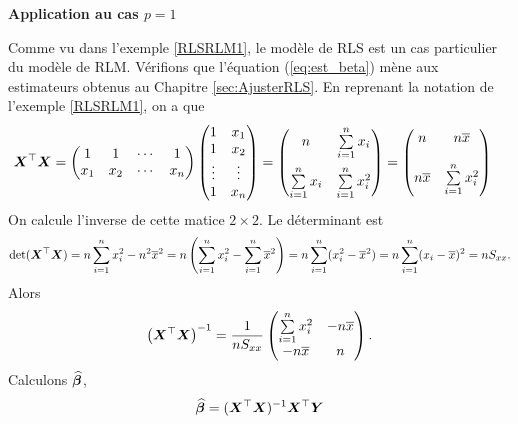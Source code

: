 \begin{exemple}
    {\bf Application au cas $p=1$}

    Comme vu dans l'exemple \ref{RLSRLM1}, le modèle de RLS est un cas particulier du modèle de RLM. Vérifions que l'équation (\ref{eq:est_beta}) mène aux estimateurs obtenus au Chapitre \ref{sec:AjusterRLS}.
    En reprenant la notation de l'exemple \ref{RLSRLM1}, on a que 
    \begin{align*}
        \bm{X}^\top \bm{X}
        &=
        \begin{pmatrix}
        1 & 1 & \cdots & 1   \\
        x_1 & x_{2} & \cdots & x_n  
    \end{pmatrix}
        \begin{pmatrix}
        1 & x_{1}   \\
        1 & x_{2}  \\
        \vdots & \vdots \\
        1 & x_{n}  
    \end{pmatrix}
    = \begin{pmatrix}
        n & \sum\limits_{i=1}^n x_i  \\[4mm]
        \sum\limits_{i=1}^n x_i  & \sum\limits_{i=1}^n x_i^2
    \end{pmatrix}
    = 
    \begin{pmatrix}
        n & n \overline{x} \\[4mm]
         n \overline{x}   & \sum\limits_{i=1}^n x_i^2
    \end{pmatrix}
    \end{align*}
   On calcule l'inverse de cette matice $2\times 2$. Le déterminant est 
   $$	\mathrm{det}(\bm{X}^\top\bm{X}) = n \sum_{i=1}^n x_i^2 - n^2\overline{x}^2
	= n \left(\sum_{i=1}^n x_i^2 - \sum_{i=1}^n \overline{x}^2\right)
	= n \sum_{i=1}^n  (x_i^2 - \overline{x}^2)
	= n \sum_{i=1}^n  (x_i - \overline{x})^2
	= n S_{xx}. $$
    Alors
    \begin{align*}
        \left(\bm{X}^\top \bm{X}\right) ^{-1}
        =  \frac{1}{nS_{xx}} \begin{pmatrix}
            \sum\limits_{i=1}^n x_i^2 & -n\overline{x}\\
            -n\overline{x} & n 
        \end{pmatrix}.
    \end{align*}
    Calculons $\widehat{\bm\beta}$,
    \begin{align*}
        \hbobeta
        &= (\boX^\top \boX)^{-1} \boX^\top \boY \\

\end{align*}
\end{exemple}
